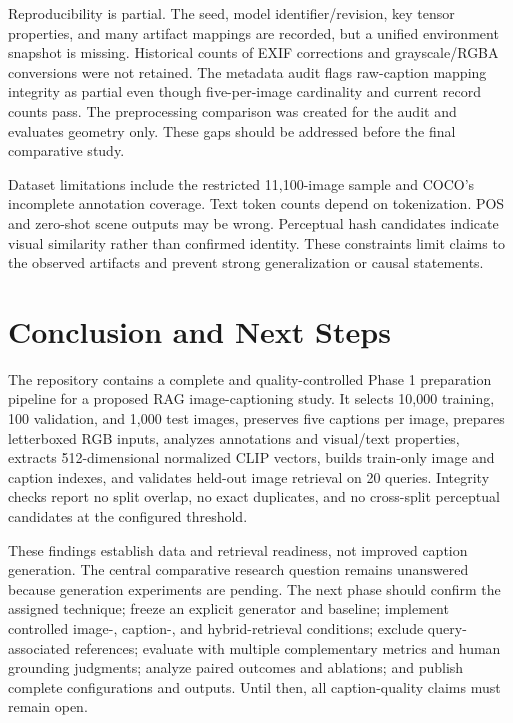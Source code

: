 Reproducibility is partial. The seed, model identifier/revision, key tensor properties, and many artifact mappings are recorded, but a unified environment snapshot is missing. Historical counts of EXIF corrections and grayscale/RGBA conversions were not retained. The metadata audit flags raw-caption mapping integrity as partial even though five-per-image cardinality and current record counts pass. The preprocessing comparison was created for the audit and evaluates geometry only. These gaps should be addressed before the final comparative study.

Dataset limitations include the restricted 11,100-image sample and COCO's incomplete annotation coverage. Text token counts depend on tokenization. POS and zero-shot scene outputs may be wrong. Perceptual hash candidates indicate visual similarity rather than confirmed identity. These constraints limit claims to the observed artifacts and prevent strong generalization or causal statements.

\section{Conclusion and Next Steps}\label{ch:conclusion}
The repository contains a complete and quality-controlled Phase 1 preparation pipeline for a proposed RAG image-captioning study. It selects 10,000 training, 100 validation, and 1,000 test images, preserves five captions per image, prepares letterboxed RGB inputs, analyzes annotations and visual/text properties, extracts 512-dimensional normalized CLIP vectors, builds train-only image and caption indexes, and validates held-out image retrieval on 20 queries. Integrity checks report no split overlap, no exact duplicates, and no cross-split perceptual candidates at the configured threshold.

These findings establish data and retrieval readiness, not improved caption generation. The central comparative research question remains unanswered because generation experiments are pending. The next phase should confirm the assigned technique; freeze an explicit generator and baseline; implement controlled image-, caption-, and hybrid-retrieval conditions; exclude query-associated references; evaluate with multiple complementary metrics and human grounding judgments; analyze paired outcomes and ablations; and publish complete configurations and outputs. Until then, all caption-quality claims must remain open.

\appendix
